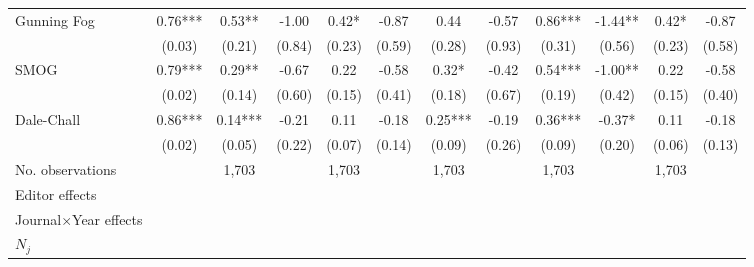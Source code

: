 \begin{sidewaystable}
\begin{threeparttable}
\begin{tabular}{p{3cm}S@{}S@{}S@{}S@{}S@{}S@{}S@{}S@{}S@{}S@{}S@{}}
            Gunning Fog                   &        0.76***&        0.53** &       -1.00   &        0.42*  &       -0.87   &        0.44   &       -0.57   &        0.86***&       -1.44** &        0.42*  &       -0.87   \\
                                          &      (0.03)   &      (0.21)   &      (0.84)   &      (0.23)   &      (0.59)   &      (0.28)   &      (0.93)   &      (0.31)   &      (0.56)   &      (0.23)   &      (0.58)   \\
            SMOG                          &        0.79***&        0.29** &       -0.67   &        0.22   &       -0.58   &        0.32*  &       -0.42   &        0.54***&       -1.00** &        0.22   &       -0.58   \\
                                          &      (0.02)   &      (0.14)   &      (0.60)   &      (0.15)   &      (0.41)   &      (0.18)   &      (0.67)   &      (0.19)   &      (0.42)   &      (0.15)   &      (0.40)   \\
            Dale-Chall                    &        0.86***&        0.14***&       -0.21   &        0.11   &       -0.18   &        0.25***&       -0.19   &        0.36***&       -0.37*  &        0.11   &       -0.18   \\
                                          &      (0.02)   &      (0.05)   &      (0.22)   &      (0.07)   &      (0.14)   &      (0.09)   &      (0.26)   &      (0.09)   &      (0.20)   &      (0.06)   &      (0.13)   \\
            \midrule
            No. observations              &               &       1,703   &               &       1,703   &               &       1,703   &               &       1,703   &               &       1,703   &               \\
            \midrule
            Editor effects       &               &           {}   &               &           {}   &               &           {}   &               &           {}   &               &               &               \\
            Journal\(\times\)Year effects          &               &           {}   &               &           {}   &               &           {}   &               &           {}   &               &               &               \\
            \(N_j\)                       &               &           {}   &               &           {}   &               &           {}   &               &           {}   &               &               &               \\

\end{tabular}
\end{threeparttable}
\end{sidewaystable}
